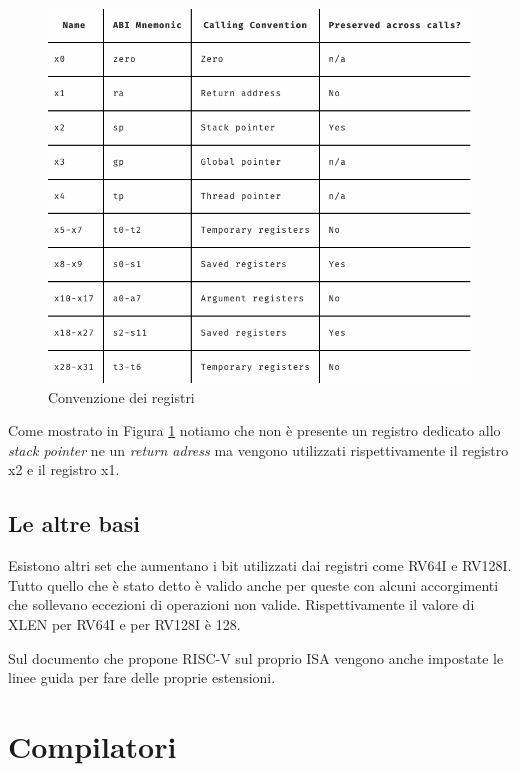 \documentclass[12pt,a4paper]{report}
\begin{document}
\begin{figure}[h!]
\centering
	\includegraphics[scale=0.3]{ABI-RISC-V}
	\caption{Convenzione dei registri}
	\label{Fig:ConvenzioneRegistri}
\end{figure}

Come mostrato in Figura \ref{Fig:ConvenzioneRegistri} notiamo che non è presente un registro dedicato allo \textit{stack pointer} ne un \textit{return adress} ma vengono utilizzati rispettivamente il registro x2 e il registro x1.


\section{Le altre basi}
Esistono altri set che aumentano i bit utilizzati dai registri come RV64I e RV128I. Tutto quello che è stato detto è valido anche per queste con alcuni accorgimenti che sollevano eccezioni di operazioni non valide.
Rispettivamente il valore di XLEN per RV64I e per RV128I è 128.


Sul documento che propone RISC-V sul proprio ISA vengono anche impostate le linee guida per fare delle proprie estensioni.




\chapter{Compilatori}
\end{document}
